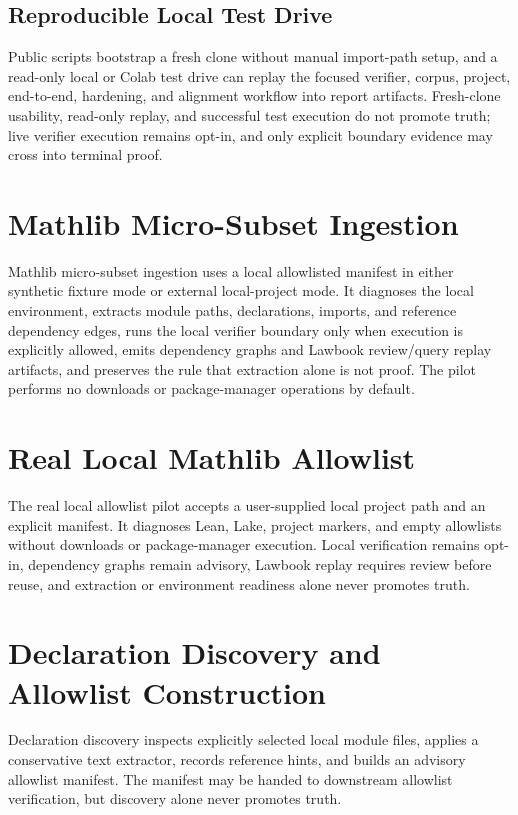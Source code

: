 \documentclass[11pt,a4paper]{article}
\begin{document}
\subsection{Reproducible Local Test Drive}
Public scripts bootstrap a fresh clone without manual import-path setup, and a
read-only local or Colab test drive can replay the focused verifier, corpus,
project, end-to-end, hardening, and alignment workflow into report artifacts.
Fresh-clone usability, read-only replay, and successful test execution do not
promote truth; live verifier execution remains opt-in, and only explicit
boundary evidence may cross into terminal proof.

\section{Mathlib Micro-Subset Ingestion}
Mathlib micro-subset ingestion uses a local allowlisted manifest in either
synthetic fixture mode or external local-project mode. It diagnoses the local
environment, extracts module paths, declarations, imports, and reference
dependency edges, runs the local verifier boundary only when execution is
explicitly allowed, emits dependency graphs and Lawbook review/query replay
artifacts, and preserves the rule that extraction alone is not proof. The pilot
performs no downloads or package-manager operations by default.

\section{Real Local Mathlib Allowlist}
The real local allowlist pilot accepts a user-supplied local project path and an
explicit manifest. It diagnoses Lean, Lake, project markers, and empty
allowlists without downloads or package-manager execution. Local verification
remains opt-in, dependency graphs remain advisory, Lawbook replay requires
review before reuse, and extraction or environment readiness alone never
promotes truth.

\section{Declaration Discovery and Allowlist Construction}
Declaration discovery inspects explicitly selected local module files, applies a
conservative text extractor, records reference hints, and builds an advisory
allowlist manifest. The manifest may be handed to downstream allowlist
verification, but discovery alone never promotes truth.
\end{document}
